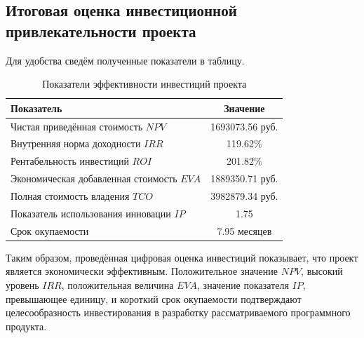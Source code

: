 \subsection*{Итоговая оценка инвестиционной привлекательности проекта}

Для удобства сведём полученные показатели в таблицу.

\begin{table}[h]
\centering
\caption{Показатели эффективности инвестиций проекта}
\label{tab:investment_metrics}
\begin{tabular}{|p{8cm}|c|}
\hline
Показатель & Значение \\ \hline
Чистая приведённая стоимость $NPV$ & 1693073.56 руб. \\ \hline
Внутренняя норма доходности $IRR$ & 119.62\% \\ \hline
Рентабельность инвестиций $ROI$ & 201.82\% \\ \hline
Экономическая добавленная стоимость $EVA$ & 1889350.71 руб. \\ \hline
Полная стоимость владения $TCO$ & 3982879.34 руб. \\ \hline
Показатель использования инновации $IP$ & 1.75 \\ \hline
Срок окупаемости & 7.95 месяцев \\ \hline
\end{tabular}
\end{table}

Таким образом, проведённая цифровая оценка инвестиций показывает, что
проект является экономически эффективным. Положительное значение
$NPV$, высокий уровень $IRR$, положительная величина $EVA$, значение
показателя $IP$, превышающее единицу, и короткий срок окупаемости
подтверждают целесообразность инвестирования в разработку
рассматриваемого программного продукта.
